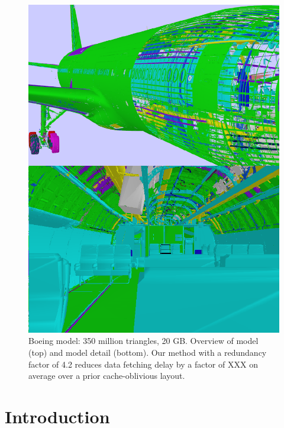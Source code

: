
\begin{figure}[h!]
  \centering
  \includegraphics[width=\columnwidth]{BoeingModel.pdf}
  \caption{Boeing model: 350 million triangles, 20 GB. Overview of model (top)
and model detail (bottom). Our method with a redundancy factor of 4.2 reduces
data fetching delay by a factor of XXX on average over a
prior cache-oblivious
layout.}
  \label{fig:model2}
\end{figure}

\section{Introduction}


